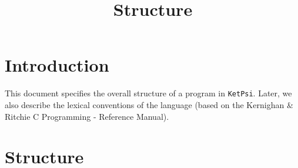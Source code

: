 \documentclass{article}
\title{Structure}
\begin{document}
\maketitle


\section{Introduction}
This document specifies the overall structure of a program in \texttt{KetPsi}. Later, we also describe the lexical conventions of the language (based on the Kernighan \& Ritchie C Programming - Reference Manual).

\section{Structure}
\end{document}
